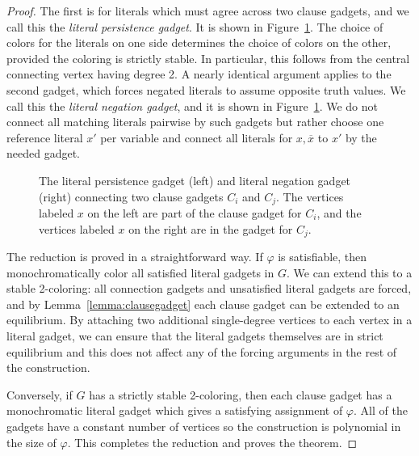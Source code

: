 \begin{proof}
The first is for literals which must agree across two clause gadgets, and we
call this the \emph{literal persistence gadget}. It is shown in
Figure~\ref{fig:connectiongadgets}. The choice of colors for the literals on
one side determines the choice of colors on the other, provided the coloring is
strictly stable. In particular, this follows from the central connecting vertex
having degree 2. A nearly identical argument applies to the second gadget,
which forces negated literals to assume opposite truth values. We call this the
\emph{literal negation gadget}, and it is shown in
Figure~\ref{fig:connectiongadgets}.  We do not connect all matching literals
pairwise by such gadgets but rather choose one reference literal $x'$ per
variable and connect all literals for $x, \overline{x}$ to $x'$ by the needed
gadget.

\begin{figure}[htb]
\centering
{}
\caption{The literal persistence gadget (left) and literal negation gadget
(right) connecting two clause gadgets $C_i$ and $C_j$. The vertices labeled $x$
on the left are part of the clause gadget for $C_i$, and the vertices labeled
$x$ on the right are in the gadget for $C_j$.}
\label{fig:connectiongadgets}
\end{figure}

The reduction is proved in a straightforward way. If $\varphi$ is satisfiable,
then monochromatically color all satisfied literal gadgets in $G$. We can
extend this to a stable 2-coloring: all connection gadgets and unsatisfied
literal gadgets are forced, and by Lemma~\ref{lemma:clausegadget} each clause
gadget can be extended to an equilibrium. By attaching two additional
single-degree vertices to each vertex in a literal gadget, we can ensure that
the literal gadgets themselves are in strict equilibrium and this does not
affect any of the forcing arguments in the rest of the construction.

Conversely, if $G$ has a strictly stable 2-coloring, then each clause gadget
has a monochromatic literal gadget which gives a satisfying assignment of
$\varphi$. All of the gadgets have a constant number of vertices so the
construction is polynomial in the size of $\varphi$. This completes the
reduction and proves the theorem.
\end{proof}

